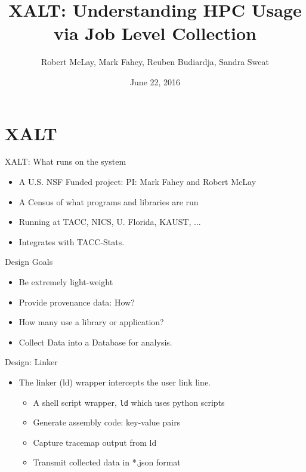 \documentclass{beamer}
\title{XALT: Understanding HPC Usage via Job Level Collection}
\author{Robert McLay, Mark Fahey, Reuben Budiardja, Sandra Sweat}
\institute{The Texas Advanced Computing Center, Argonne National Labs, NICS}
\date{June 22, 2016}  %
\begin{document}
\begin{frame}
  \titlepage
\end{frame}

\section{XALT}

\begin{frame}{XALT: What runs on the system}
  \begin{itemize}
    \item A U.S. NSF Funded project: PI: Mark Fahey and Robert McLay
    \item A Census of what programs and libraries are run
    \item Running at TACC, NICS, U. Florida, KAUST, ...
    \item Integrates with TACC-Stats.
  \end{itemize}
\end{frame}

\begin{frame}{Design Goals}
  \begin{itemize}
    \item Be extremely light-weight
    \item Provide provenance data: How?
    \item How many use a library or application?
    \item Collect Data into a Database for analysis.
  \end{itemize}
\end{frame}

\begin{frame}{Design: Linker }
  \begin{itemize}
    \item The linker (ld) wrapper intercepts the user link line.
      \begin{itemize}
        \item A shell script wrapper, \texttt{ld} which uses python
          scripts
        \item Generate assembly code: key-value pairs
        \item Capture tracemap output from ld
        \item Transmit collected data in *.json format
      \end{itemize}
  \end{itemize}
\end{frame}
\end{document}
